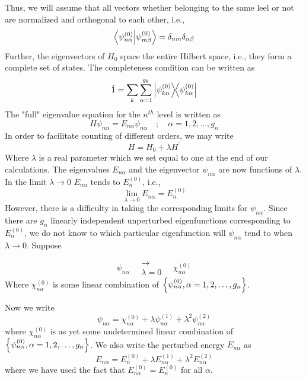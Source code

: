 	Thus, we will assume that all vectors whether belonging to the same leel or not are normalized and orthogonal to each other, i.e.,
	\begin{equation}
		\braket{\psi^{(0)}_{n\alpha}}{\psi^{(0)}_{m\beta}} = \delta_{n m}\delta_{\alpha \beta}
		\label{chapter20.eqn5-degenerate} 
	\end{equation}
	Further, the eigenvectors of $H_0$ space the entire Hilbert space, i.e., they form a complete set of states. The completeness condition can be written as
	\begin{equation}
		\hat{1} = \sum_{k} \sum_{\alpha = 1}^{g_k} \ketbra{\psi^{(0)}_{k\alpha}}{\psi^{(0)}_{k\alpha}}
		\label{chapter20.eqn6-degenerate} 
	\end{equation}
	The "full" eigenvalue equation for the $n^{th}$ level is written as
	\begin{equation}
		H \psi_{n \alpha} = E_{n \alpha} \psi_{n \alpha} \quad ; \quad \alpha = 1,2,\ldots,g_n
		\label{chapter20.eqn7-degenerate} 
	\end{equation}
	In order to facilitate counting of different orders, we may write
	\begin{equation}
		H = H_0 + \lambda H^\prime
	\end{equation}
	Where $\lambda$ is a real parameter which we set equal to one at the end of our calculations.
	The eigenvalues $E_{n \alpha}$ and the eigenvector $\psi_{n\alpha}$ are now functions of $\lambda$. In the limit $\lambda \rightarrow 0$ $E_{n\alpha}$ tends to $E_n^{(0)}$, i.e.,
	\begin{equation}
		\lim\limits_{\lambda \rightarrow 0} E_{n\alpha} = E_n^{(0)}
		\label{chapter20.eqn8-degenerate} 
	\end{equation}
	However, there is a difficulty in taking the corresponding limits for $\psi_{n\alpha}$. Since there are $g_n$ linearly independent unperturbed eigenfunctions corresponding to $E_n^{(0)}$, we do not know to which particular eigenfunction will $\psi_{n\alpha}$ tend to when $\lambda \rightarrow 0$. Suppose
	
	\begin{equation}
		\psi_{n\alpha} \quad \substack{\rightarrow \\ \lambda=0} \quad \chi_{n\alpha}^{(0)}
	\end{equation}
	Where $\chi_{n\alpha}^{(0)}$ is some linear combination of $\qty{\psi_{n \alpha}^{(0)}, \alpha=1,2,\ldots,g_n}$.
	
	Now we write
	\begin{equation}
		\psi_{n \alpha} = \chi_{n\alpha}^{(0)} + \lambda \psi_{n \alpha}^{(1)} + \lambda^2 \psi_{n \alpha}^{(2)}
		\label{chapter20.eqn9-degenerate} 
	\end{equation}
	where $\chi_{n\alpha}^{(0)}$ is as yet some undetermined linear combination of $\qty{\psi_{n \alpha}^{(0)}, \alpha=1,2,\ldots,g_n}$. We also write the perturbed energy $E_{n\alpha}$ as 
	\begin{equation}
		E_{n\alpha} = E_n^{(0)} + \lambda E_{n\alpha}^{(1)} + \lambda^2 E_{n\alpha}^{(2)}
		\label{chapter20.eqn10-degenerate}
	\end{equation}
	where we have used the fact that $E_{n\alpha}^{(0)} = E_n^{(0)}$ for all $\alpha$.
	
